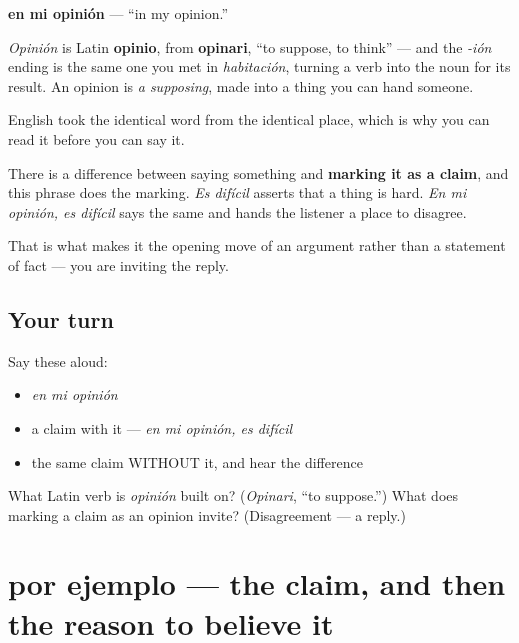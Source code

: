 \begin{cousinweb}
\textbf{en mi opinión} — \textquotedblleft{}in my opinion.\textquotedblright{}

\emph{Opinión} is Latin \textbf{opinio}, from \textbf{opinari}, \textquotedblleft{}to suppose, to think\textquotedblright{} — and the \emph{-ión} ending is the same one you met in \emph{habitación}, turning a verb into the noun for its result. An opinion is \emph{a supposing}, made into a thing you can hand someone.

English took the identical word from the identical place, which is why you can read it before you can say it.
\end{cousinweb}

\begin{grammarlens}[title={What you've built}]
There is a difference between saying something and \textbf{marking it as a claim}, and this phrase does the marking. \emph{Es difícil} asserts that a thing is hard. \emph{En mi opinión, es difícil} says the same and hands the listener a place to disagree.

That is what makes it the opening move of an argument rather than a statement of fact — you are inviting the reply.
\end{grammarlens}

\subsection*{Your turn}
Say these aloud:

\begin{itemize}
\raggedright
  \item \emph{en mi opinión}
  \item a claim with it — \emph{en mi opinión, es difícil}
  \item the same claim WITHOUT it, and hear the difference
\end{itemize}

\begin{tcolorbox}[breakable,colback=teal!4,colframe=teal!35!black,title={Before you move on}]
What Latin verb is \emph{opinión} built on? (\emph{Opinari}, \textquotedblleft{}to suppose.\textquotedblright{}) What does marking a claim as an opinion invite? (Disagreement — a reply.)
\end{tcolorbox}
\section[por ejemplo]{por ejemplo — the claim, and then the reason to believe it}

